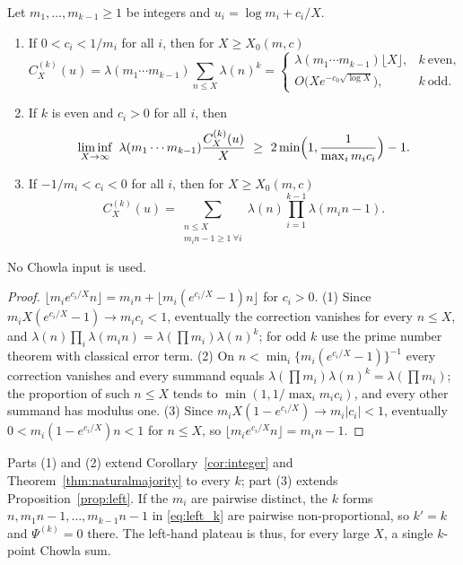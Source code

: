 \begin{theorem}
\label{thm:integer_k}
Let $m_1,\dots,m_{k-1}\ge1$ be integers and $u_i=\log m_i+c_i/X$.
\begin{enumerate}
\item If $0<c_i<1/m_i$ for all $i$, then for $X\ge X_0(m,c)$
\begin{equation}
C^{(k)}_X(u)=\lambda(m_1\cdots m_{k-1})\sum_{n\le X}\lambda(n)^k=
\begin{cases}\lambda(m_1\cdots m_{k-1})\lfloor X\rfloor,& k\ \text{even},\\[1mm]
O\bigl(Xe^{-c_0\sqrt{\log X}}\bigr),& k\ \text{odd}.\end{cases}
\label{eq:plateau_k}
\end{equation}
\item If $k$ is even and $c_i>0$ for all $i$, then
\begin{equation}
\liminf_{X\to\infty}\ \lambda(m_1\cdots m_{k-1})\frac{C^{(k)}_X(u)}{X}\ \ge\ 2\min\Bigl(1,\frac1{\max_im_ic_i}\Bigr)-1 .
\label{eq:majority_k}
\end{equation}
\item If $-1/m_i<c_i<0$ for all $i$, then for $X\ge X_0(m,c)$
\begin{equation}
C^{(k)}_X(u)=\sum_{\substack{n\le X\\ m_in-1\ge1\ \forall i}}\lambda(n)\prod_{i=1}^{k-1}\lambda(m_in-1).
\label{eq:left_k}
\end{equation}
\end{enumerate}
No Chowla input is used.
\end{theorem}

\begin{proof}
$\lfloor m_ie^{c_i/X}n\rfloor=m_in+\lfloor m_i(e^{c_i/X}-1)n\rfloor$ for $c_i>0$. (1) Since $m_iX(e^{c_i/X}-1)\to m_ic_i<1$, eventually the correction vanishes for every $n\le X$, and $\lambda(n)\prod_i\lambda(m_in)=\lambda(\prod m_i)\lambda(n)^k$; for odd $k$ use the prime number theorem with classical error term. (2) On $n<\min_i\{m_i(e^{c_i/X}-1)\}^{-1}$ every correction vanishes and every summand equals $\lambda(\prod m_i)\lambda(n)^k=\lambda(\prod m_i)$; the proportion of such $n\le X$ tends to $\min(1,1/\max_im_ic_i)$, and every other summand has modulus one. (3) Since $m_iX(1-e^{c_i/X})\to m_i|c_i|<1$, eventually $0<m_i(1-e^{c_i/X})n<1$ for $n\le X$, so $\lfloor m_ie^{c_i/X}n\rfloor=m_in-1$.
\end{proof}

Parts (1) and (2) extend Corollary~\ref{cor:integer} and Theorem~\ref{thm:naturalmajority} to every $k$; part (3) extends Proposition~\ref{prop:left}. If the $m_i$ are pairwise distinct, the $k$ forms $n,m_1n-1,\dots,m_{k-1}n-1$ in \eqref{eq:left_k} are pairwise non-proportional, so $k'=k$ and $\Psi^{(k)}=0$ there. The left-hand plateau is thus, for every large $X$, a single $k$-point Chowla sum.

